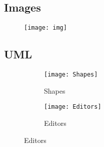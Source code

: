 \subsection{Images}

\begin{figure}[H]
    \texttt{[image: img]}
    \centering
\end{figure}

\subsection{UML}
\begin{figure}[H]
    \begin{subfigure}{.5\textwidth}
        \centering
        \texttt{[image: Shapes]}
        \caption{Shapes}
    \end{subfigure}
    \hfill
    \begin{subfigure}{.5\textwidth}
        \centering
        \texttt{[image: Editors]}
        \caption{Editors}
    \end{subfigure}
\end{figure}


